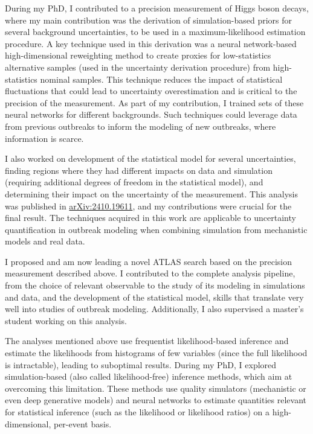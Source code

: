 \documentclass[11pt, a4paper]{awesome-cv}
\begin{document}
\begin{cvletter}
During my PhD, I contributed to a precision measurement of Higgs boson decays, where my main contribution was the derivation of simulation-based priors for several background uncertainties, to be used in a maximum-likelihood estimation procedure. A key technique used in this derivation was a neural network-based high-dimensional reweighting method to create proxies for low-statistics alternative samples (used in the uncertainty derivation procedure) from high-statistics nominal samples. This technique reduces the impact of statistical fluctuations that could lead to uncertainty overestimation and is critical to the precision of the measurement. As part of my contribution, I trained sets of these neural networks for different backgrounds. Such techniques could leverage data from previous outbreaks to inform the modeling of new outbreaks, where information is scarce.

I also worked on development of the statistical model for several uncertainties, finding regions where they had different impacts on data and simulation (requiring additional degrees of freedom in the statistical model), and determining their impact on the uncertainty of the measurement. This analysis was published in \href{https://arxiv.org/abs/2410.19611}{arXiv:2410.19611}, and my contributions were crucial for the final result. The techniques acquired in this work are applicable to uncertainty quantification in outbreak modeling when combining simulation from mechanistic models and real data.

I proposed and am now leading a novel ATLAS search based on the precision measurement described above. I contributed to the complete analysis pipeline, from the choice of relevant observable to the study of its modeling in simulations and data, and the development of the statistical model, skills that translate very well into studies of outbreak modeling. Additionally, I also supervised a master's student working on this analysis.


The analyses mentioned above use frequentist likelihood-based inference and estimate the likelihoods from histograms of few variables (since the full likelihood is intractable), leading to suboptimal results. During my PhD, I explored simulation-based (also called likelihood-free) inference methods, which aim at overcoming this limitation. These methods use quality simulators (mechanistic or even deep generative models) and neural networks to estimate quantities relevant for statistical inference (such as the likelihood or likelihood ratios) on a high-dimensional, per-event basis.


\end{cvletter}
\end{document}

